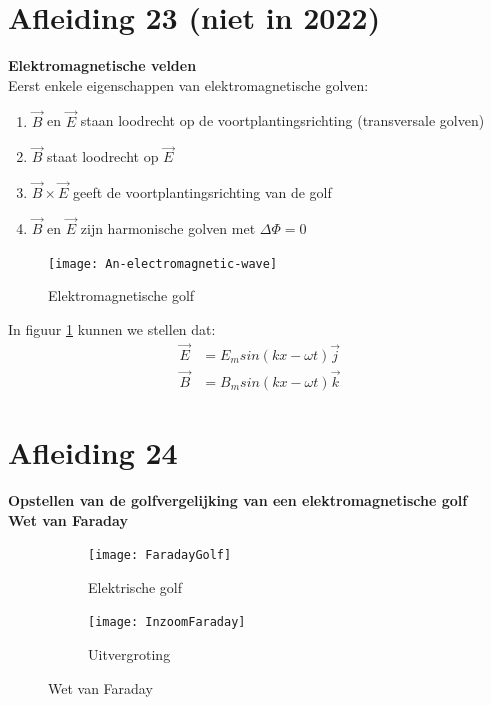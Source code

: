 \documentclass[a4paper,kul]{kulakarticle} %
\begin{document}
\section{Afleiding 23 (niet in 2022)}
\textbf{Elektromagnetische velden}\\
Eerst enkele eigenschappen van elektromagnetische golven:
\begin{enumerate}
	\item $\vec{B}$ en $\vec{E}$ staan loodrecht op de voortplantingsrichting (transversale golven)
	\item $\vec{B}$ staat loodrecht op $\vec{E}$
	\item $\vec{B} \times\vec{E}$ geeft de voortplantingsrichting van de golf
	\item $\vec{B}$ en $\vec{E}$ zijn harmonische golven met $\Delta\Phi = 0$
\end{enumerate}
\begin{figure}[h]
	\centering
	\texttt{[image: An-electromagnetic-wave]}
	\caption[Elektromagnetische golf]{Elektromagnetische golf}
	\label{fig:an-electromagnetic-wave}
\end{figure}
In figuur \ref{fig:an-electromagnetic-wave} kunnen we stellen dat:
\begin{align*}
	\vec{E} &= E_msin(kx-\omega t)\vec{j}\\
	\vec{B} &= B_msin(kx-\omega t)\vec{k}
\end{align*}
\newpage
\section{Afleiding 24}
\textbf{Opstellen van de golfvergelijking van een elektromagnetische golf}\\
\textbf{Wet van Faraday}\\
\begin{figure}[h]
	\centering
	\begin{subfigure}{.5\textwidth}
		\centering
		\texttt{[image: FaradayGolf]}
		\caption[Elektrische golf]{Elektrische golf}
		\label{fig:faradaygolf}
	\end{subfigure}%
	\begin{subfigure}{.5\textwidth}
		\centering
		\texttt{[image: InzoomFaraday]}
		\caption[Inzoom Faraday]{Uitvergroting}
		\label{fig:inzoomfaraday}
	\end{subfigure}
	\caption{Wet van Faraday}
	\label{fig:InductieFaraday}
\end{figure}\\
\end{document}
